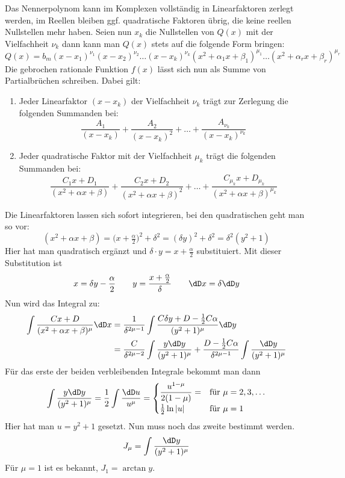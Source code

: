 Das Nennerpolynom kann im Komplexen vollständig in Linearfaktoren zerlegt
werden, im Reellen bleiben ggf. quadratische Faktoren übrig, die keine reellen
Nullstellen mehr haben. Seien nun $x_k$ die Nullstellen von $Q(x)$ mit der
Vielfachheit $\nu_k$ dann kann man $Q(x)$ stets auf die folgende Form bringen:
\begin{equation}
  \label{eq:69}
  Q(x)=b_m(x-x_1)^{\nu_1}(x-x_2)^{\nu_2}\dots(x-x_k)^{\nu_k}
  (x^2+\alpha_1x+\beta_1)^{\mu_1}\dots(x^2+\alpha_rx+\beta_r)^{\mu_r}
\end{equation}
Die gebrochen rationale Funktion $f(x)$ lässt sich nun als Summe von
Partialbrüchen schreiben. Dabei gilt:
\begin{enumerate}
\item Jeder Linearfaktor $(x-x_k)$ der Vielfachheit $\nu_k$ trägt zur
  Zerlegung die folgenden Summanden bei:
  \[
  \frac{A_1}{(x-x_k)}+\frac{A_2}{(x-x_k)^2}+\dots
  +\frac{A_{\nu_k}}{(x-x_k)^{\nu_k}}
  \]
\item Jeder quadratische Faktor mit der Vielfachheit $\mu_k$ trägt die
  folgenden Summanden bei:
  \[
  \frac{C_1x+D_1}{(x^2+\alpha x+\beta)}+
  \frac{C_2x+D_2}{(x^2+\alpha x+\beta)^2}+\dots+
  \frac{C_{\mu_k}x+D_{\mu_k}}{(x^2+\alpha x+\beta)^{\mu_k}}
  \]
\end{enumerate}

\noindent Die Linearfaktoren lassen sich sofort integrieren, bei den
quadratischen geht man so vor:
\[
(x^2+\alpha x+\beta)=\bigl(x+\tfrac{\alpha}{2}\bigr)^2+\delta^2
=(\delta y)^2+\delta^2=\delta^2(y^2+1)
\]
Hier hat man quadratisch ergänzt und $\delta\cdot y=x+\frac{\alpha}{2}$
substituiert. Mit dieser Substitution ist
\[
x=\delta y-\frac{\alpha}{2}\qquad y=\frac{x+\frac{\alpha}{2}}{\delta}\qquad
\dD x=\delta\dD y
\]
Nun wird das Integral zu:
\begin{align*}
  \int\frac{Cx+D}{(x^2+\alpha x+\beta)^\mu}\dD x
  &=\frac{1}{\delta^{2\mu-1}}
  \int\frac{C\delta y+D-\frac12C\alpha}{(y^2+1)^\mu}\dD y\\
  &=\frac{C}{\delta^{2\mu-2}}\int\frac{y\dD y}{(y^2+1)^\mu}
  +\frac{D-\frac12C\alpha}{\delta^{2\mu-1}}\int\frac{\dD y}{(y^2+1)^\mu}
\end{align*}
Für das erste der beiden verbleibenden Integrale bekommt man dann
\begin{equation}
  \label{eq:70}
  \int\frac{y\dD y}{(y^2+1)^\mu}=\frac12\int\frac{\dD u}{u^\mu}=
  \begin{cases}
    \dfrac{u^{1-\mu}}{2(1-\mu)}=&\text{für~}\mu=2, 3, \dots\\
    \frac{1}{2}\ln|u|& \text{für~} \mu=1
  \end{cases}
\end{equation}
Hier hat man $u=y^2+1$ gesetzt. Nun muss noch das zweite bestimmt werden.
\[
J_\mu=\int\frac{\dD y}{(y^2+1)^\mu}
\]
Für $\mu=1$ ist es bekannt, $J_1=\arctan y$.

